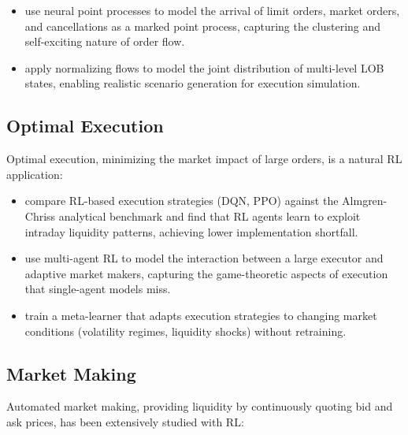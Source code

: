 \begin{itemize}[leftmargin=*]
    \item \citet{Cont2021} use neural point processes to model the arrival of limit orders, market orders, and cancellations as a marked point process, capturing the clustering and self-exciting nature of order flow.

    \item \citet{Shi2022} apply normalizing flows to model the joint distribution of multi-level LOB states, enabling realistic scenario generation for execution simulation.
\end{itemize}

\subsection{Optimal Execution}

Optimal execution, minimizing the market impact of large orders, is a natural RL application:

\begin{itemize}[leftmargin=*]
    \item \citet{Ning2021} compare RL-based execution strategies (DQN, PPO) against the Almgren-Chriss analytical benchmark \citep{Almgren2001} and find that RL agents learn to exploit intraday liquidity patterns, achieving lower implementation shortfall.

    \item \citet{Fang2021} use multi-agent RL to model the interaction between a large executor and adaptive market makers, capturing the game-theoretic aspects of execution that single-agent models miss.

    \item \citet{Schnaubelt2022} train a meta-learner that adapts execution strategies to changing market conditions (volatility regimes, liquidity shocks) without retraining.
\end{itemize}

\subsection{Market Making}

Automated market making, providing liquidity by continuously quoting bid and ask prices, has been extensively studied with RL:

